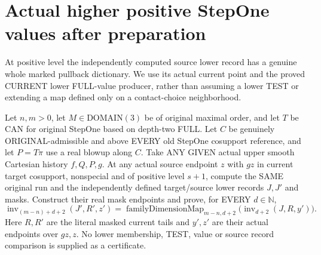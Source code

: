 \section{Actual higher positive StepOne values after preparation}

At positive level the independently computed source lower record has a
genuine whole marked pullback dictionary. We use its actual current point
and the proved CURRENT lower FULL-value producer, rather than assuming a
lower TEST or extending a map defined only on a contact-choice neighborhood.

\begin{theorem}
\label{hir:original-prepared-bound-three-positive-run-lower-full-values}
\leanok
Let $n,m>0$, let $M\in\mathrm{DOMAIN}(3)$ be of original maximal order,
and let $T$ be CAN for original StepOne based on depth-two FULL. Let $C$
be genuinely ORIGINAL-admissible and above EVERY old StepOne cosupport
reference, and let $P=T\pi$ use a real blowup along $C$. Take ANY GIVEN
actual upper smooth Cartesian history $f,Q,P,g$.
At any actual source endpoint $z$ with $gz$ in current target cosupport,
nonspecial and of positive level $s+1$, compute the SAME original run and
the independently defined target/source lower records $J,J'$ and masks.
Construct their real mask endpoints and prove, for EVERY $d\in\mathbb N$,
\[
 \operatorname{inv}_{(m-n)+d+2}(J',R',z')=
 \operatorname{familyDimensionMap}_{m-n,d+2}
   \bigl(\operatorname{inv}_{d+2}(J,R,y')\bigr).
\]
Here $R,R'$ are the literal masked current tails and $y',z'$ are their
actual endpoints over $gz,z$. No lower membership, TEST, value or source
record comparison is supplied as a certificate.
\end{theorem}
